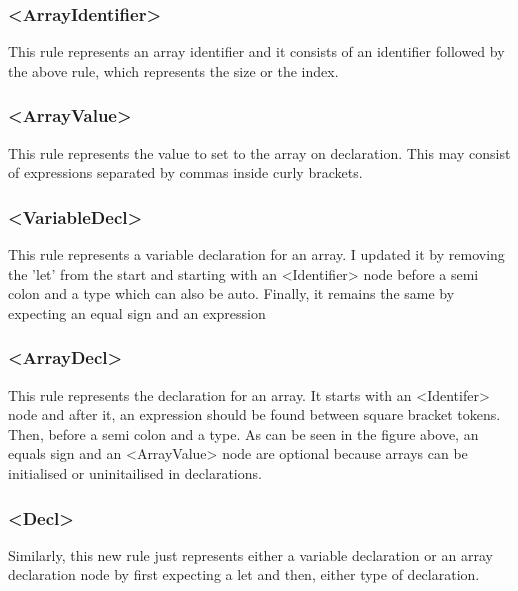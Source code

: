 \documentclass{article}
\begin{document}
				\subsubsection{\textless ArrayIdentifier\textgreater}
				
				This rule represents an array identifier and it consists of an identifier followed by the above rule, which represents the size or the index.
				
				\subsubsection{\textless ArrayValue\textgreater}
				
				This rule represents the value to set to the array on declaration. This may consist of expressions separated by commas inside curly brackets.
				
				\subsubsection{\textless VariableDecl\textgreater}
				
				This rule represents a variable declaration for an array. I updated it by removing the 'let' from the start and starting with an <Identifier> node before a semi colon and a type which can also be auto. Finally, it remains the same by expecting an equal sign and an expression
				
				\subsubsection{\textless ArrayDecl\textgreater}
				
				This rule represents the declaration for an array. It starts with an \textless Identifer\textgreater{} node and after it, an expression should be found between square bracket tokens. Then,  before a semi colon and a type. As can be seen in the figure above, an equals sign and an \textless ArrayValue\textgreater{} node are optional because arrays can be initialised or uninitailised in declarations.
				
				
				\subsubsection{\textless Decl\textgreater}
				
				Similarly, this new rule just represents either a variable declaration or an array declaration node by first expecting a let and then, either type of declaration.
				
\end{document}
